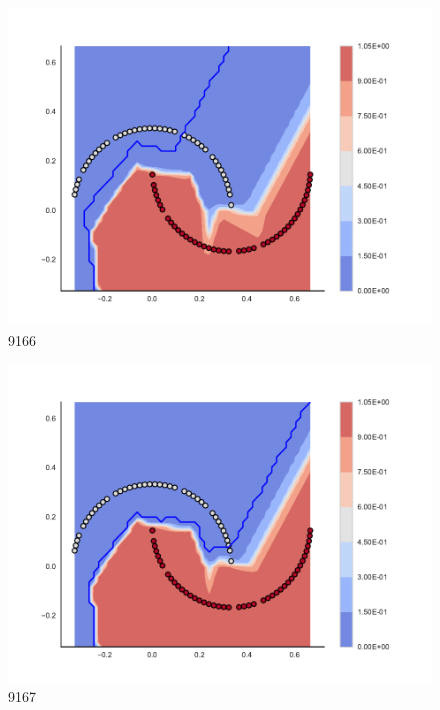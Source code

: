 \begin{subfigure}[b]{0.09\textwidth}
    \includegraphics[clip, trim=2.35cm 1.75cm 4.5cm 0cm,width=\textwidth]{img/convergence/9166.pdf}
    \caption{9166}
    \label{fig:convergence_9166}
\end{subfigure}
%
\begin{subfigure}[b]{0.09\textwidth}
    \includegraphics[clip, trim=2.35cm 1.75cm 4.5cm 0cm,width=\textwidth]{img/convergence/9167.pdf}
    \caption{9167}
    \label{fig:convergence_9167}
\end{subfigure}
%
